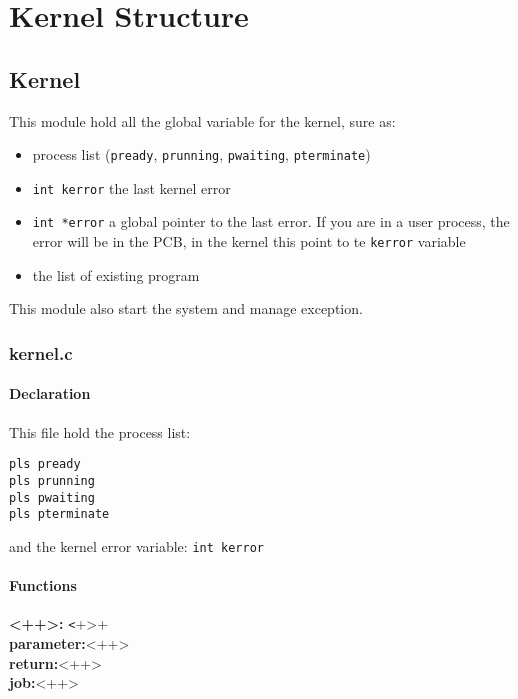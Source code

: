 \chapter{Kernel Structure}

\section{Kernel}

This module hold all the global variable for the kernel, sure as:
\begin{itemize}
  \item process list (\verb+pready+, \verb+prunning+, \verb+pwaiting+, \verb+pterminate+)
  \item \verb+int kerror+ the last kernel error
  \item \verb+int *error+ a global pointer to the last error. If you are in a user process, the error will be in the PCB, in the kernel this point to te \verb+kerror+ variable
  \item the list of existing program
\end{itemize}

This module also start the system and manage exception.

\subsection{kernel.c}

\subsubsection{Declaration}

This file hold the process list:
\begin{verbatim}
pls pready
pls prunning
pls pwaiting
pls pterminate
\end{verbatim}

and the kernel error variable: \verb+int kerror+\\

\subsubsection{Functions}

\noindent\textbf{<++>:} \verb+<++>+\\
\textbf{parameter:}<++>\\
\textbf{return:}<++>\\
\textbf{job:}<++>\\

